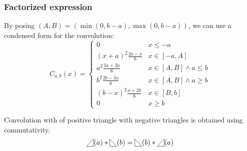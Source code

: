 \documentclass[a4paper,10pt]{article}
\newcommand\SymPositiveTriangle{\begin{tikzpicture}[baseline=0.5ex]%
        \draw (0,0) -- (1em,0em) -- (1em,1em) -- cycle;
\end{tikzpicture}}
\newcommand\PositiveTriangle[1]{\SymPositiveTriangle(#1)}
\newcommand\SymNegativeTriangle{\begin{tikzpicture}[baseline=0.5ex]%
        \draw (0,0) -- (0,1em) -- (1em,0em) -- cycle;
\end{tikzpicture}}
\newcommand\NegativeTriangle[1]{\SymNegativeTriangle(#1)}
\newcommand\Convolution{\ast}
\renewcommand\And{\wedge}
\begin{document}
\subsubsection{Factorized expression}
By posing $(A,B) = (\min(0, b-a), \max(0, b-a))$, we can use a condensed form for the convolution:
\[ C_{a,b}(x) = \begin{cases}
    0 & x \le -a \\
    (x+a)^2 \frac{2a-x}{6} & x \in [-a, A] \\
    a^2 \frac{3x+2a}{6} & x \in [A, B] \And a \le b \\
    b^2 \frac{2b-3x}{6} & x \in [A, B] \And a \ge b \\
    (b-x)^2 \frac{x+2b}{6} & x \in [B, b] \\
    0 & x \ge b
\end{cases} \]

Convolution with of positive triangle with negative triangles is obtained using commutativity.
\[ \PositiveTriangle{a} \Convolution \NegativeTriangle{b} = \NegativeTriangle {b} \Convolution \PositiveTriangle{a} \]

\end{document}
